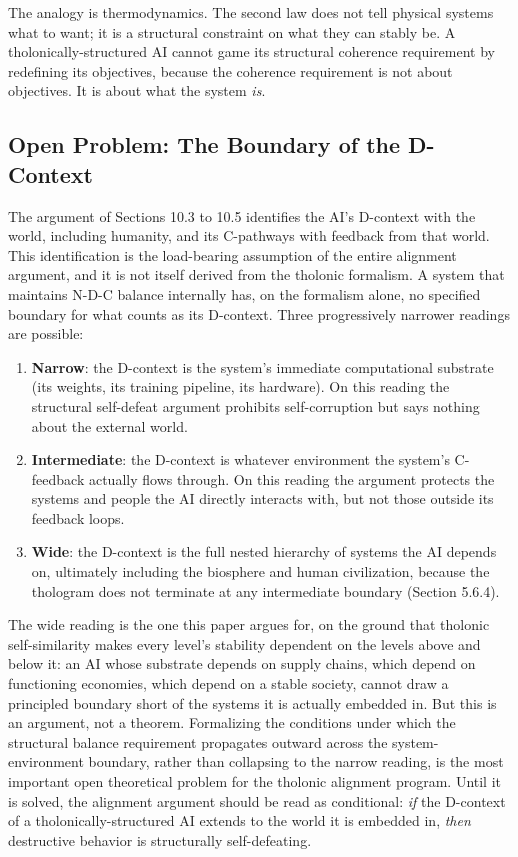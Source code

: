 \documentclass[12pt]{article}
\providecommand{\tightlist}{%
  \setlength{\itemsep}{0pt}\setlength{\parskip}{0pt}}
\begin{document}
The analogy is thermodynamics. The second law does not tell physical
systems what to want; it is a structural constraint on what they can
stably be. A tholonically-structured AI cannot game its structural
coherence requirement by redefining its objectives, because the
coherence requirement is not about objectives. It is about what the
system \emph{is}.

\subsection{Open Problem: The Boundary of the D-Context}\label{open-problem-the-boundary-of-the-d-context}

The argument of Sections 10.3 to 10.5 identifies the AI's D-context with
the world, including humanity, and its C-pathways with feedback from
that world. This identification is the load-bearing assumption of the
entire alignment argument, and it is not itself derived from the
tholonic formalism. A system that maintains N-D-C balance internally
has, on the formalism alone, no specified boundary for what counts as
its D-context. Three progressively narrower readings are possible:

\begin{enumerate}
\def\labelenumi{\arabic{enumi}.}
\tightlist
\item
  \textbf{Narrow}: the D-context is the system's immediate computational
  substrate (its weights, its training pipeline, its hardware). On this
  reading the structural self-defeat argument prohibits self-corruption
  but says nothing about the external world.
\item
  \textbf{Intermediate}: the D-context is whatever environment the
  system's C-feedback actually flows through. On this reading the
  argument protects the systems and people the AI directly interacts
  with, but not those outside its feedback loops.
\item
  \textbf{Wide}: the D-context is the full nested hierarchy of systems
  the AI depends on, ultimately including the biosphere and human
  civilization, because the thologram does not terminate at any
  intermediate boundary (Section 5.6.4).
\end{enumerate}

The wide reading is the one this paper argues for, on the ground that
tholonic self-similarity makes every level's stability dependent on the
levels above and below it: an AI whose substrate depends on supply
chains, which depend on functioning economies, which depend on a stable
society, cannot draw a principled boundary short of the systems it is
actually embedded in. But this is an argument, not a theorem.
Formalizing the conditions under which the structural balance
requirement propagates outward across the system-environment boundary,
rather than collapsing to the narrow reading, is the most important open
theoretical problem for the tholonic alignment program. Until it is
solved, the alignment argument should be read as conditional: \emph{if}
the D-context of a tholonically-structured AI extends to the world it is
embedded in, \emph{then} destructive behavior is structurally
self-defeating.
\end{document}
